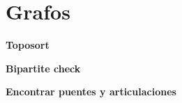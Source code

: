 \section{Grafos}
    \textbf{Toposort}
    

    \textbf{Bipartite check}
    

    \textbf{Encontrar puentes y articulaciones}
    